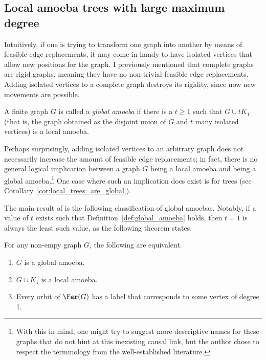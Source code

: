 \subsection{Local amoeba trees with large maximum degree}\label{subsec:new_recursive}

Intuitively, if one is trying to transform one graph into another by means of feasible edge replacements, it may come in handy to have isolated vertices that allow new positions for the graph.
I previously mentioned that complete graphs are rigid graphs, meaning they have no non-trivial feasible edge replacements.
Adding isolated vertices to a complete graph destroys its rigidity, since now new movements are possible.

\begin{definition}\label{def:global_amoeba}
    A finite graph $G$ is called a \emph{global amoeba} if there is a $t\geq1$ such that $G\cup tK_1$ (that is, the graph obtained as the disjoint union of $G$ and $t$ many isolated vertices) is a local amoeba.
\end{definition}

Perhaps surprisingly, adding isolated vertices to an arbitrary graph does not necessarily increase the amount of feasible edge replacements; in fact, there is no general logical implication between a graph $G$ being a local amoeba and being a global amoeba.\footnote{With this in mind, one might try to suggest more descriptive names for these graphs that do not hint at this inexisting causal link, but the author chose to respect the terminology from the well-established literature.}
One case where such an implication does exist is for trees (see Corollary~\ref{cor:local_trees_are_global}).

The main result of \cite{Caroetal2023} is the following classification of global amoebas.
Notably, if a value of $t$ exists such that Definition~\ref{def:global_amoeba} holds, then $t=1$ is always the least such value, as the following theorem states.

\begin{theorem}\label{thm:classification_global}
    For any non-empy graph $G$, the following are equivalent.
    
    \begin{enumerate}
        \item $G$ is a global amoeba.
        
        \item $G\cup K_1$ is a local amoeba.
        
        \item Every orbit of $\Fer(G)$ has a label that corresponds to some vertex of degree 1.
    \end{enumerate}
\end{theorem}

